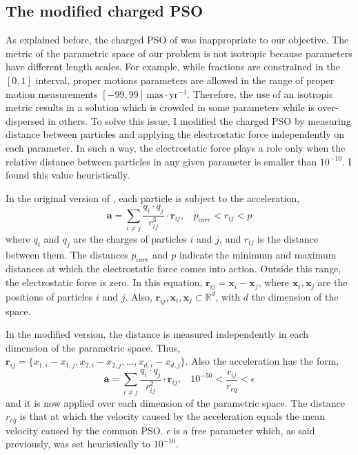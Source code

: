 \subsection{The modified charged PSO}
\label{sect:chargedPSO}
As explained before, the charged PSO of \citet{Blackwell2002} was inappropriate to our objective. The metric of the parametric space of our problem is not isotropic because parameters have different length scales. For example, while fractions are constrained in the $[0,1]$ interval, proper motions parameters are allowed in the range of proper motion measurements $[-99,99]\,\mathrm{mas\cdot yr^{-1}}$. Therefore, the use of an isotropic metric results in a solution which is crowded in some parameters while is over-dispersed in others. 
To solve this issue, I modified the charged PSO by measuring distance between particles and applying the electrostatic force independently on each parameter. In such a way, the electrostatic force plays a role only when the relative distance between particles in any given parameter is smaller than $10^{-10}$. I found this value heuristically.

In the original version of  \citet{Blackwell2002}, each particle is subject to the acceleration,
\begin{equation}
\label{eq:PSOacc}
\mathbf{a}=\sum_{i\neq j} \frac{q_i \cdot q_j }{r_{ij}^3} \cdot \mathbf{r}_{ij}, \ \ \ \ p_{core} < r_{ij} < p
\end{equation}
where $q_i$ and $q_j$ are the charges of particles $i$ and $j$, and $r_{ij}$ is the distance between them. The distances $p_{core}$ and $p$ indicate the minimum and maximum distances at which the electrostatic force comes into action. Outside this range, the electrostatic force is zero. In this equation, $\mathbf{r}_{ij}= \mathbf{x}_i -\mathbf{x}_j$, where $\mathbf{x}_i,\mathbf{x}_j$ are the positions of particles $i$ and $j$. Also, $\mathbf{r}_{ij},\mathbf{x}_i,\mathbf{x}_j \subset \mathbb{R}^d$, with $d$ the dimension of the space. 

In the modified version, the distance is measured independently in each dimension of the parametric space. Thus, $\mathbf{r}_{ij}= \{x_{1,i} -x_{1,j},x_{2,i} -x_{2,j},...,x_{d,i} -x_{d,j}\}$. Also the acceleration has the form,
\begin{equation}
\label{eq:PSOacc}
\mathbf{a}=\sum_{i\neq j} \frac{q_i \cdot q_j }{r_{ij}^2} \cdot \mathbf{r}_{ij}, \ \ \ \  10^{-50} < \frac{r_{ij}}{r_{eq}} < \epsilon
\end{equation}
and it is now applied over each dimension of the parametric space. The distance $r_{eq}$ is that at which the velocity caused by the acceleration equals the mean velocity caused by the common PSO. $\epsilon$ is a free parameter which, as said previously, was set heuristically to $10^{-10}$.

